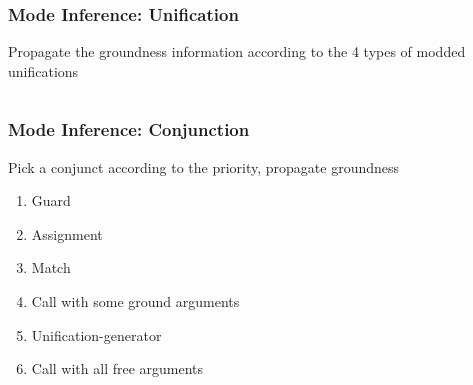 \documentclass[xcolor=table, aspectratio=169]{beamer}
\begin{document}
\begin{frame}[fragile]
  \frametitle{Mode Inference: Unification}
\begin{center}
Propagate the groundness information according to the 4 types of modded unifications
\end{center}

\begin{columns}
  \begin{column}[t]{0.3\textwidth}
  \end{column}
  \begin{column}[t]{0.2\textwidth}
    
  \end{column}
  \begin{column}[t]{0.2\textwidth}
    
  \end{column}
  \begin{column}[t]{0.3\textwidth}
  \end{column}
\end{columns}

\begin{columns}
  \begin{column}[t]{0.3\textwidth}
  \end{column}
  \begin{column}[t]{0.2\textwidth}
    
  \end{column}
  \begin{column}[t]{0.2\textwidth}
    
  \end{column}
  \begin{column}[t]{0.3\textwidth}
  \end{column}
\end{columns}

\end{frame}

\begin{frame}[fragile]
  \frametitle{Mode Inference: Conjunction}
\begin{center}
Pick a conjunct according to the priority, propagate groundness
\end{center}

\vfill

\begin{center}
  \begin{minipage}{0.4\textwidth}
    \begin{enumerate}
      \item Guard
      \item Assignment
      \item Match
      \item Call with some ground arguments
      \item Unification-generator
      \item Call with all free arguments
    \end{enumerate}
  \end{minipage}
\end{center}


\end{frame}
\end{document}
